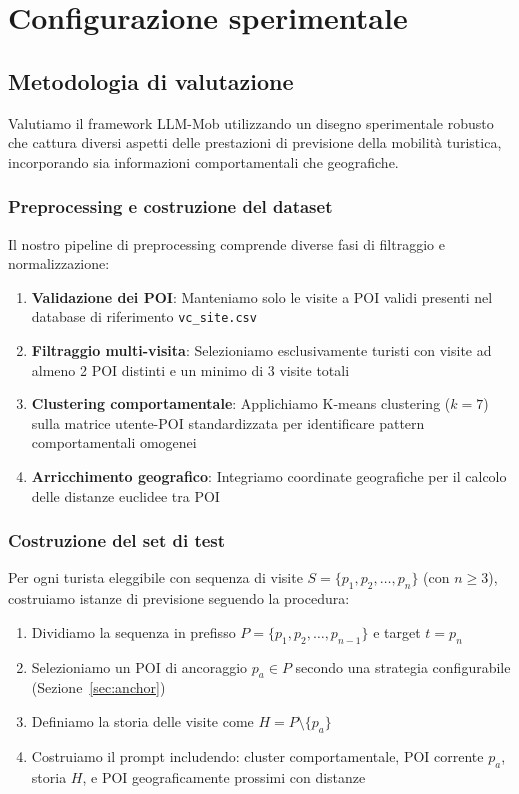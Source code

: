 \chapter{Configurazione sperimentale}

\section{Metodologia di valutazione}

Valutiamo il framework LLM-Mob utilizzando un disegno sperimentale robusto che cattura diversi aspetti delle prestazioni di previsione della mobilità turistica, incorporando sia informazioni comportamentali che geografiche.

\subsection{Preprocessing e costruzione del dataset}

Il nostro pipeline di preprocessing comprende diverse fasi di filtraggio e normalizzazione:

\begin{enumerate}
\item \textbf{Validazione dei POI}: Manteniamo solo le visite a POI validi presenti nel database di riferimento \texttt{vc\_site.csv}
\item \textbf{Filtraggio multi-visita}: Selezioniamo esclusivamente turisti con visite ad almeno 2 POI distinti e un minimo di 3 visite totali
\item \textbf{Clustering comportamentale}: Applichiamo K-means clustering ($k=7$) sulla matrice utente-POI standardizzata per identificare pattern comportamentali omogenei
\item \textbf{Arricchimento geografico}: Integriamo coordinate geografiche per il calcolo delle distanze euclidee tra POI
\end{enumerate}

\subsection{Costruzione del set di test}

Per ogni turista eleggibile con sequenza di visite $S = \{p_1, p_2, \ldots, p_n\}$ (con $n \geq 3$), costruiamo istanze di previsione seguendo la procedura:

\begin{enumerate}
\item Dividiamo la sequenza in prefisso $P = \{p_1, p_2, \ldots, p_{n-1}\}$ e target $t = p_n$
\item Selezioniamo un POI di ancoraggio $p_a \in P$ secondo una strategia configurabile (Sezione~\ref{sec:anchor})
\item Definiamo la storia delle visite come $H = P \setminus \{p_a\}$
\item Costruiamo il prompt includendo: cluster comportamentale, POI corrente $p_a$, storia $H$, e POI geograficamente prossimi con distanze
\end{enumerate}

